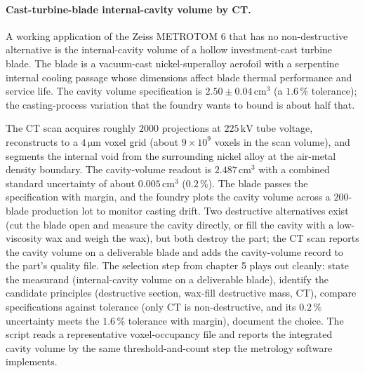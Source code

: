 \paragraph{Cast-turbine-blade internal-cavity volume by CT.}
A working application of the Zeiss METROTOM 6 that has no
non-destructive alternative is the internal-cavity volume of a
hollow investment-cast turbine blade. The blade is a vacuum-cast
nickel-superalloy aerofoil with a serpentine internal cooling
passage whose dimensions affect blade thermal performance and
service life. The cavity volume specification is
$2.50 \pm 0.04 \,\si{\centi\meter\cubed}$ (a $1.6\,\%$ tolerance);
the casting-process variation that the foundry wants to bound is
about half that.

The CT scan acquires roughly $2000$ projections at $225 \,\si
{\kilo\volt}$ tube voltage, reconstructs to a $4 \,\si{\micro
\meter}$ voxel grid (about $9 \times 10^{9}$ voxels in the scan
volume), and segments the internal void from the surrounding nickel
alloy at the air-metal density boundary. The cavity-volume readout
is $2.487 \,\si{\centi\meter\cubed}$ with a combined standard
uncertainty of about $0.005 \,\si{\centi\meter\cubed}$ ($0.2\,\%$).
The blade passes the specification with margin, and the foundry
plots the cavity volume across a $200$-blade production lot to
monitor casting drift. Two destructive alternatives exist (cut the
blade open and measure the cavity directly, or fill the cavity with
a low-viscosity wax and weigh the wax), but both destroy the part;
the CT scan reports the cavity volume on a deliverable blade and
adds the cavity-volume record to the part's quality file. The
selection step from chapter 5 plays out cleanly: state the
measurand (internal-cavity volume on a deliverable blade), identify
the candidate principles (destructive section, wax-fill destructive
mass, CT), compare specifications against tolerance (only CT is
non-destructive, and its $0.2\,\%$ uncertainty meets the $1.6\,\%$
tolerance with margin), document the choice. The
script reads a representative voxel-occupancy file and reports the
integrated cavity volume by the same threshold-and-count step the
metrology software implements.

